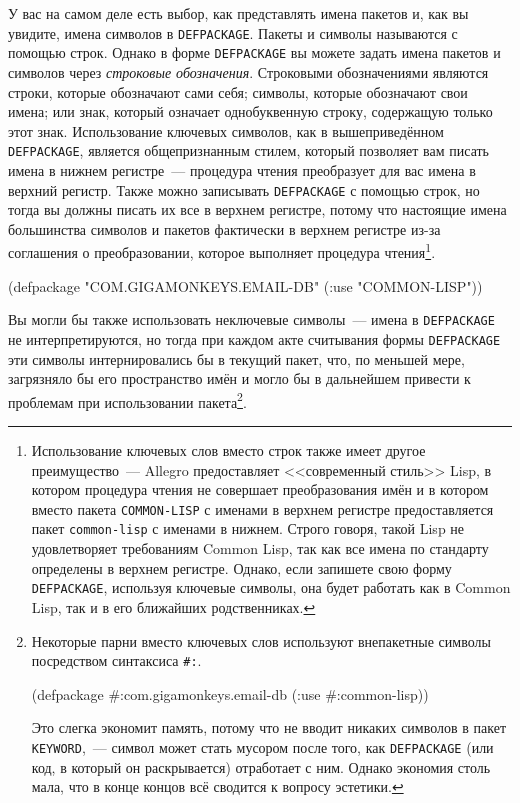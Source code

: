 У вас на самом деле есть выбор, как представлять имена пакетов и, как вы увидите, имена
символов в \lstinline{DEFPACKAGE}. Пакеты и символы называются с помощью строк. Однако в форме
\lstinline{DEFPACKAGE} вы можете задать имена пакетов и символов через \textit{строковые
  обозначения}. Строковыми обозначениями являются строки, которые обозначают сами себя;
символы, которые обозначают свои имена; или знак, который означает однобуквенную строку,
содержащую только этот знак. Использование ключевых символов, как в вышеприведённом
\lstinline{DEFPACKAGE}, является общепризнанным стилем, который позволяет вам писать имена в
нижнем регистре~--- процедура чтения преобразует для вас имена в верхний регистр.  Также можно
записывать \lstinline{DEFPACKAGE} с помощью строк, но тогда вы должны писать их все в верхнем
регистре, потому что настоящие имена большинства символов и пакетов фактически в верхнем
регистре из-за соглашения о преобразовании, которое выполняет
процедура чтения\footnote{Использование ключевых слов вместо строк также имеет другое
  преимущество~--- Allegro предоставляет <<современный стиль>> Lisp, в котором процедура чтения
  не совершает преобразования имён и в котором вместо пакета \lstinline{COMMON-LISP} с
  именами в верхнем регистре предоставляется пакет \lstinline{common-lisp} с именами в нижнем.
  Строго говоря, такой Lisp не удовлетворяет требованиям Common Lisp, так как все имена по
  стандарту определены в верхнем регистре. Однако, если запишете свою форму
  \lstinline{DEFPACKAGE}, используя ключевые символы, она будет работать как в Common Lisp, так
  и в его ближайших родственниках.}.

\begin{myverb}
(defpackage "COM.GIGAMONKEYS.EMAIL-DB"
  (:use "COMMON-LISP"))
\end{myverb}

Вы могли бы также использовать неключевые символы~--- имена в \lstinline{DEFPACKAGE} не
интерпретируются, но тогда при каждом акте считывания формы \lstinline{DEFPACKAGE} эти
символы интернировались бы в текущий пакет, что, по меньшей мере, загрязняло бы его
пространство имён и могло бы в дальнейшем привести к проблемам при использовании
пакета\footnote{Некоторые парни вместо ключевых слов используют внепакетные символы
  посредством синтаксиса \lstinline!#:!.

\begin{myverb}
(defpackage #:com.gigamonkeys.email-db
  (:use #:common-lisp))
\end{myverb}

Это слегка экономит память, потому что не вводит никаких символов в пакет
\lstinline{KEYWORD},~--- символ может стать мусором после того, как \lstinline{DEFPACKAGE} (или код,
в который он раскрывается) отработает с ним. Однако экономия столь мала, что в конце
концов всё сводится к вопросу эстетики.}.

